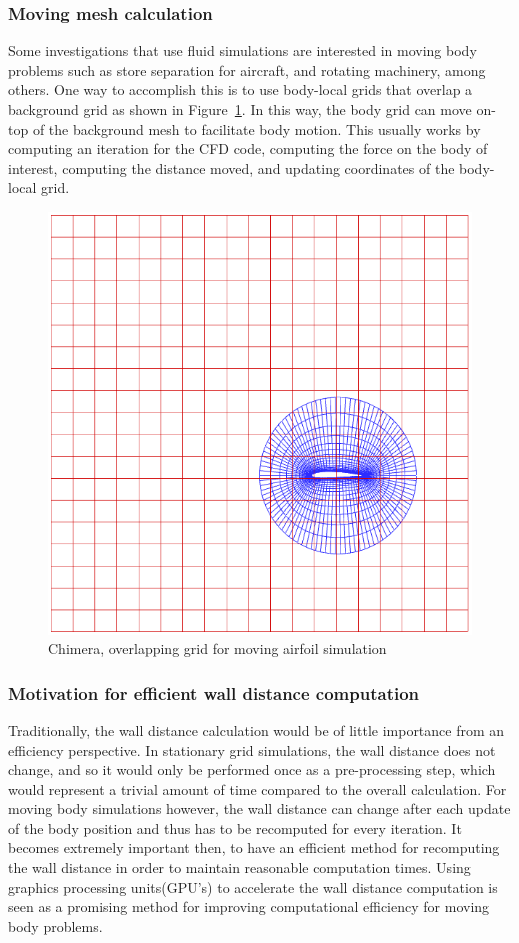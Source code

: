 \documentclass[]{aiaa-tc}%
\begin{document}
\subsubsection{Moving mesh calculation}
Some investigations that use fluid simulations are interested in moving
body problems such as store separation for aircraft, and rotating
machinery, among others. One way to accomplish this is to use
body-local grids that overlap a background grid as shown in Figure~\ref{f:chimera_grid}.\cite{galbraith:13phd} In this way, the body
grid can move on-top of the background mesh to facilitate body motion. This
usually works by computing an iteration for the CFD code, computing
the force on the body of interest, computing the distance moved, and
updating coordinates of the body-local grid.

\begin{figure}
  \centering
  \includegraphics[width=0.3\linewidth]{figures/grid/chimera_grid}
  \caption{Chimera, overlapping grid for moving airfoil simulation}
  \label{f:chimera_grid}
\end{figure}


\subsubsection{Motivation for efficient wall distance computation}
Traditionally, the wall distance calculation would be of little
importance from an efficiency perspective. In stationary grid
simulations, the wall distance does not change, and so it would only
be performed once as a pre-processing step, which would represent a
trivial amount of time compared to the overall calculation. For moving
body simulations however, the wall distance can change after each
update of the body position and thus has to be recomputed for every
iteration. It becomes extremely important then, to have an efficient
method for recomputing the wall distance in order to maintain
reasonable computation times. Using graphics processing units(GPU's)
to accelerate the wall distance computation is seen as a promising
method for improving computational efficiency for moving body
problems.
\end{document}
